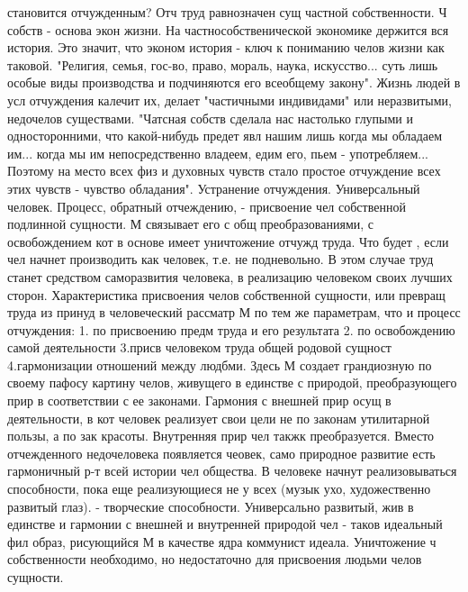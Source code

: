 \documentclass[12pt]{article}
\begin{document}
становится отчужденным?
Отч труд равнозначен сущ частной собственности. Ч собств - основа экон жизни. На частнособственической
экономике держится вся история. Это значит, что эконом история - ключ к пониманию челов жизни как таковой.
"Религия, семья, гос-во, право, мораль, наука, искусство... суть лишь особые виды производства и подчиняются
его всеобщему закону". Жизнь людей в усл отчуждения калечит их, делает "частичными индивидами" или
неразвитыми, недочелов существами. "Чатсная собств сделала нас настолько глупыми и односторонними, что
какой-нибудь предет явл нашим лишь когда мы обладаем им... когда мы им непосредственно владеем, едим его,
пьем - употребляем... Поэтому на место всех физ и духовных чувств стало простое отчуждение всех этих чувств
- чувство обладания".
Устранение  отчуждения.  Универсальный  человек.  Процесс,  обратный  отчеждению,  -  присвоение  чел
собственной подлинной сущности. М связывает его с общ преобразованиями, с освобождением кот в основе
имеет уничтожение отчужд труда. Что будет , если чел начнет производить как человек, т.е. не подневольно. В
этом случае труд станет средством саморазвития человека, в реализацию человеком своих лучших сторон.
Характеристика  присвоения  челов  собственной  сущности,  или  превращ  труда  из  принуд  в  человеческий
рассматр М по тем же параметрам, что и процесс отчуждения: 1. по присвоению предм труда и его результата 2.
по  освобождению  самой  деятельности  3.присв  человеком  труда  общей  родовой  сущност  4.гармонизации
отношений между людбми.
Здесь  М  создает  грандиозную  по  своему  пафосу  картину  челов,  живущего  в  единстве  с  природой,
преобразующего прир в соответствии с ее законами. Гармония с внешней прир осущ в деятельности, в кот
человек реализует свои цели не по законам утилитарной пользы, а по зак красоты. Внутренняя прир чел такжк
преобразуется.  Вместо  отчежденного  недочеловека  появляется  чеовек,  само  природное  развитие  есть
гармоничный  р-т  всей  истории  чел  общества.  В  человеке  начнут  реализовываться  способности,  пока  еще
реализующиеся не у всех (музык ухо, художественно развитый глаз). - творческие способности.
Универсально развитый, жив в единстве и гармонии с внешней и внутренней природой чел - таков идеальный
фил образ, рисующийся М в качестве ядра коммунист идеала. Уничтожение ч собственности необходимо, но
недостаточно для присвоения людьми челов сущности.


\newpage
\end{document}
